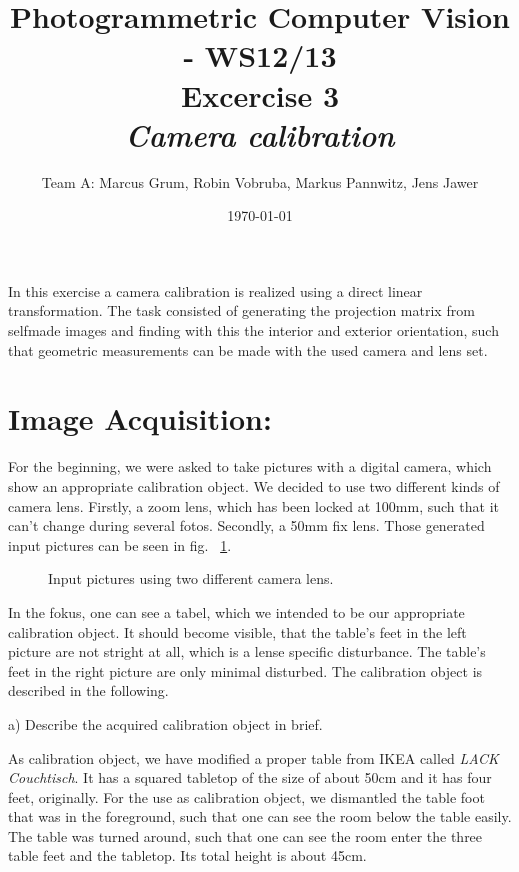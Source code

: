 \documentclass[a4paper,headings=small]{scrartcl}
\title{Photogrammetric Computer Vision - WS12/13 \\ Excercise 3 \\ \emph{Camera calibration}}
\author{Team A: Marcus Grum, Robin Vobruba, Markus Pannwitz, Jens Jawer}
\date{\today}
\numberwithin{equation}{section} %
\numberwithin{figure}{section}   %
\newcommand{\generatedImgRootImg}{../resources/img}
\begin{document}
\maketitle

In this exercise a camera calibration is realized using a direct linear transformation. 
The task consisted of generating the projection matrix from selfmade images 
and finding with this the interior and exterior orientation, 
such that geometric measurements can be made with the used camera and lens set.

\section{Image Acquisition:}

For the beginning, we were asked to take pictures with a digital camera,
which show an appropriate calibration object. 
We decided to use two different kinds of camera lens.
Firstly, a zoom lens, which has been locked at 100mm, such that it can't change
during several fotos.
Secondly, a 50mm fix lens.
Those generated input pictures can be seen in fig. ~\ref{fig:Input pictures}.

\begin{figure}
   \hfill
  \caption{Input pictures using two different camera lens.}
  \label{fig:Input pictures}
\end{figure}

In the fokus, one can see a tabel, which we intended to be our 
appropriate calibration object. It should become visible, 
that the table's feet in the left picture are not stright at all,
which is a lense specific disturbance.
The table's feet in the right picture are only minimal disturbed.
The calibration object is described in the following.

a) Describe the acquired calibration object in brief.

As calibration object, we have modified a proper table from IKEA called \emph{LACK Couchtisch}.
It has a squared tabletop of the size of about 50cm and it has four feet, originally.
For the use as calibration object, we dismantled the table foot
that was in the foreground, such that one can see the room below the table easily.
The table was turned around, such that one can see the room enter the three table feet 
and the tabletop. Its total height is about 45cm.
\end{document}
